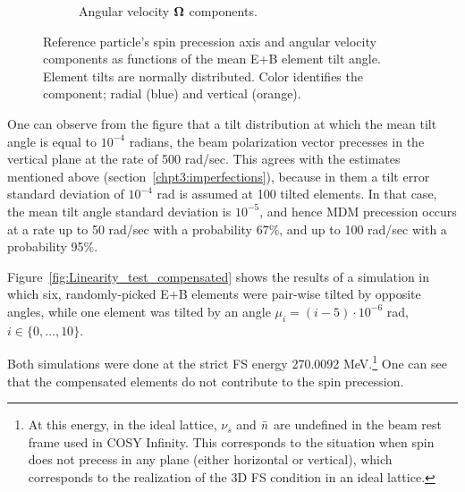 \begin{figure}[!h]
\begin{subfigure}{\linewidth}
		\caption{Angular velocity $\boldsymbol{\Omega}$ components.}
	\end{subfigure}
	\caption{Reference particle's spin precession axis and angular velocity components as
		 functions of the mean E+B element tilt angle. Element tilts are normally distributed.
		Color identifies the component; radial (blue) and vertical (orange).\label{fig:Linearity_test_shifting_gauss}}
\end{figure}

One can observe from the figure that a tilt distribution at which the mean tilt angle is equal to $10^{-4}$ radians, the
beam polarization vector precesses in the vertical plane at the rate of 500 rad/sec. This agrees with the estimates
mentioned above (section~\ref{chpt3:imperfections}), because in them a tilt error standard deviation of $10^{-4}$ rad 
is assumed at 100 tilted elements. In that case, the mean tilt angle standard deviation is $10^{-5}$, and hence MDM
precession occurs at a rate up to 50 rad/sec with a probability 67\%, and up to 100 rad/sec with a probability 95\%.

Figure~\ref{fig:Linearity_test_compensated} shows the results of a simulation in which six, randomly-picked
E+B elements were pair-wise tilted by opposite angles, while one element was tilted by an angle
$\mu_i = (i-5)\cdot 10^{-6}$ rad, $i\in\lbrace0,\dots,10\rbrace$. 

Both simulations were done at the strict FS energy 270.0092 MeV.\footnote{At this energy, in the ideal lattice, 
	$\nu_s$ and $\bar n$	are undefined in the beam rest frame used in COSY Infinity.
	This corresponds to the situation when spin does not precess in any plane (either horizontal or vertical), 
	which corresponds to the realization of the 3D FS condition in an ideal lattice.} One can see that the compensated
elements do not contribute to the spin precession.

